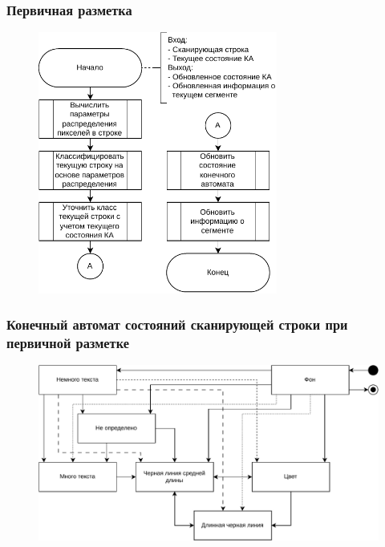 \documentclass[gray]{beamer}
\begin{document}
\begin{frame}
    \frametitle{Первичная разметка}

    \begin{figure}[H]
        \centering
        \includegraphics[width=0.7\textwidth]{diag/pres-primary.pdf}
    \end{figure}
\end{frame}

\begin{frame}
    \frametitle{Конечный автомат состояний сканирующей строки при первичной разметке}
    \begin{figure}[H]
        \centering
        \includegraphics[width=\textwidth]{diag/fsm.full.pdf}
    \end{figure}
\end{frame}
\end{document}
